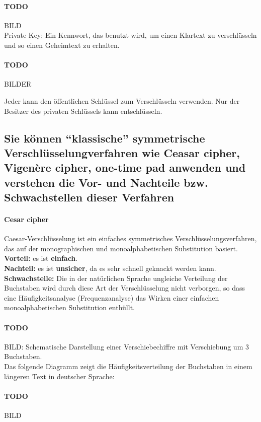 \documentclass[10pt,a4paper]{article}
\begin{document}
\paragraph*{TODO}BILD\\


Private Key: Ein Kennwort, das benutzt wird, um einen Klartext zu verschlüsseln und so einen Geheimtext zu erhalten.
\paragraph*{TODO}BILDER


Jeder kann den öffentlichen Schlüssel zum Verschlüsseln verwenden. Nur der Besitzer des privaten Schlüssels kann entschlüsseln.

\subsection*{Sie können "`klassische"' symmetrische Verschlüsselungverfahren wie Ceasar cipher, Vigenère cipher, one-time pad anwenden und verstehen die Vor- und Nachteile bzw. Schwachstellen dieser Verfahren}
\paragraph*{Cesar cipher}Caesar-Verschlüsselung ist ein einfaches symmetrisches Verschlüsselungsverfahren, das auf der monographischen und monoalphabetischen Substitution basiert.\\
\textbf{Vorteil:} es ist \textbf{einfach}.\\
\textbf{Nachteil:} es ist \textbf{unsicher}, da es sehr schnell geknackt werden kann.\\
\textbf{Schwachstelle:} Die in der natürlichen Sprache ungleiche Verteilung der Buchstaben wird durch diese Art der Verschlüsselung nicht verborgen, so dass eine Häufigkeitsanalyse (Frequenzanalyse) das Wirken einer einfachen monoalphabetischen Substitution enthüllt.
\paragraph*{TODO}BILD: Schematische Darstellung einer Verschiebechiffre mit Verschiebung um 3 Buchstaben.\\

\noindent
Das folgende Diagramm zeigt die Häufigkeitsverteilung der Buchstaben in einem längeren Text in deutscher Sprache:
\paragraph*{TODO}BILD
\end{document}

